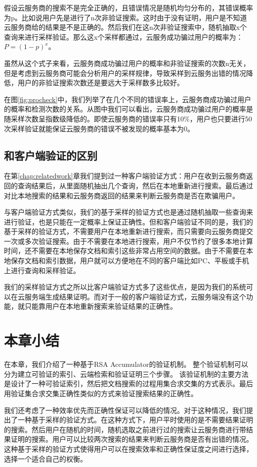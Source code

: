 假设云服务商的搜索不是完全正确的，且错误情况是随机均匀分布的，其错误概率为p。比如说用户先是进行了n次非验证搜索。这时由于没有证明，用户是不知道云服务商给的结果是不是正确的。然后我们在这n次非验证搜索中，随机抽取x个查询来进行采样验证。那么这x个采样都通过，云服务成功骗过用户的概率为：$P = (1-p)^x$。

虽然从这个式子来看，云服务商成功骗过用户的概率和非验证搜索的次数n无关，但是考虑到云服务商可能会分析用户的采样规律，导致采样到云服务出错的情况降低，用户的非验证搜索次数还是要远大于采样数多比较好。

在图\ref{fig:procheck}中，我们列举了在几个不同的错误率上，云服务商成功骗过用户的概率和检测次数的关系。从图中我们可以看出，云服务商成功骗过用户的概率是随采样次数呈指数级降低的。即使云服务商的错误率只有10\%，用户也只要进行50次采样验证就能保证云服务商的错误不被发现的概率基本为0。

\subsection{和客户端验证的区别}
在第\ref{chap:relatedwork}章我们提到过一种客户端验证方式：用户在收到云服务商返回的查询结果后，从里面随机抽出几个查询，然后在本地重新进行搜索。最后通过对比本地搜索的结果和云服务商返回的结果来判断云服务商是否在欺骗用户。

与客户端验证方式类似，我们的基于采样的验证方式也是通过随机抽取一些查询来进行验证，也是只能在一定概率上保证正确性。但和客户端验证不同的是，我们的基于采样的验证方式，不需要用户在本地重新进行搜索，而只需要向云服务商提交一次或多次验证搜索。由于不需要在本地进行搜索，用户不仅节约了很多本地计算时间，还不需要在本地保存文档和索引这些非常占用空间的数据。由于不需要在本地保存文档和索引数据，用户就可以方便地在不同的客户端比如PC、平板或手机上进行查询和采样验证。

我们的采样验证方式之所以比客户端验证方式多了这些优点，是因为我们的系统可以在云服务端生成结果证明。而对于一般的客户端验证方式，云服务端没有这个功能，就只能靠用户在本地重新搜索来验证结果的正确性。

\section{本章小结}
在本章，我们介绍了一种基于RSA Accumulator的验证机制。
整个验证机制可以分为建立可验证的索引、云端检索和验证证明三个步骤。
该验证机制的主要方法是设计了一种可验证索引，然后把文档搜索的过程用集合求交集的方式表示。最后用验证集合求交集正确性类似的方式来验证搜索结果的正确性。

我们还考虑了一种效率优先而正确性保证可以降低的情况。对于这种情况，我们提出了一种基于采样的验证方式。在这种方式下，用户平时使用的是不需要结果证明的搜索。然后用户在随机的时间，随机选取之前进行过的搜索让云服务商进行带结果证明的搜索。用户可以比较两次搜索的结果来判断云服务商是否有出错的情况。这种基于采样的验证方式使得用户可以在搜索效率和正确性保证度之间进行选择，选择一个适合自己的权衡。
